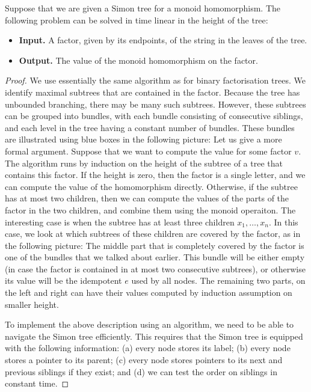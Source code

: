 \begin{lemma}\label{lem:factorisation-forest-evaluation}
    Suppose that we are given a Simon tree for a monoid homomorphism. The following problem can be solved in time linear in the  height of the tree:
    \begin{itemize}
            \item \textbf{Input.} A factor, given by its endpoints, of the string in the leaves of the tree.
            \item \textbf{Output.} The value of the monoid homomorphism on the factor.
    \end{itemize}
\end{lemma}
\begin{proof}
    We use essentially the same algorithm as for binary factorisation trees.  We identify maximal subtrees that are contained in the factor. Because the tree has unbounded branching, there may be many such subtrees. However, these subtrees can be grouped into bundles, with each bundle consisting of consecutive siblings, and each level in the tree having a constant number of bundles. These bundles are  illustrated using blue boxes in the following picture:
Let us give a more formal argument. Suppose that we want to compute the value for some factor $v$. The algorithm runs by induction on the height of the subtree of a tree that contains this factor. If the height is zero, then the factor is a single letter, and we can compute the value of the homomorphism directly. Otherwise, if the subtree has at most two children, then we can compute the values of the parts of the factor in the two children, and combine them using the monoid operaiton. The interesting case is when the subtree has at least three children $x_1,\ldots,x_n$. In this case, we look at which subtrees of these children are covered by the factor, as in the following picture:
The middle part  that is completely covered by the factor is one of the bundles that we talked about earlier. This bundle will be either empty (in case the factor is contained in at most two consecutive subtrees), or otherwise its value will be the idempotent $e$ used by all nodes. The remaining two parts, on the left and right can have their values computed by induction assumption on smaller height. 

To implement the above description using an algorithm, we need to be able to navigate the Simon tree efficiently. This requires that the Simon tree is equipped with the following  information: (a) every node stores its label; (b) every node stores a pointer to its parent; (c) every node stores pointers to its next and previous siblings if they exist; and (d) we can test the order on siblings in constant time.
\end{proof}


